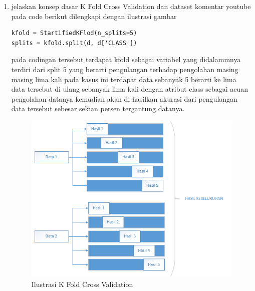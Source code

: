 \begin{enumerate}
\item jelaskan konsep dasar K Fold Cross Validation dan dataset komentar youtube pada code berikut dilengkapi dengan ilustrasi gambar  
\begin{verbatim}
kfold = StartifiedKFlod(n_splits=5)
splits = kfold.split(d, d['CLASS'])
\end{verbatim}
pada codingan tersebut terdapat kfold sebagai variabel yang didalammnya terdiri dari split 5 yang berarti pengulangan terhadap pengolahan masing masing lima kali pada kasus ini terdapat data sebanyak 5 berarti ke lima data tersebut di ulang sebanyak lima kali dengan atribut class sebagai acuan pengolahan datanya kemudian akan di hasilkan akurasi dari pengulangan data tersebut sebesar sekian persen tergantung datanya.
\begin{figure}[ht]
\centering
\includegraphics[scale=0.4]{figures/1174012/chapter7/1,2.PNG}
\caption{Ilustrasi K Fold Cross Validation}
\label{Contoh}
\end{figure}



\end{enumerate}

